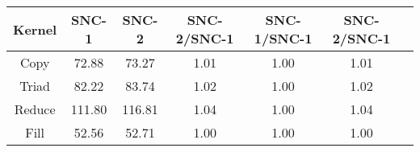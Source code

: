 \begin{tabular}{|c|c|c|c|c|c|c|}  \hline
Kernel&SNC-1&SNC-2 & SNC-2/SNC-1 & SNC-1/SNC-1 & SNC-2/SNC-1 \\ \hline 
Copy & 72.88 & 73.27  & 1.01 & 1.00 & 1.01 \\ \hline 
Triad & 82.22 & 83.74  & 1.02 & 1.00 & 1.02 \\ \hline 
Reduce & 111.80 & 116.81  & 1.04 & 1.00 & 1.04 \\ \hline 
Fill & 52.56 & 52.71  & 1.00 & 1.00 & 1.00 \\ \hline 
\end{tabular}
